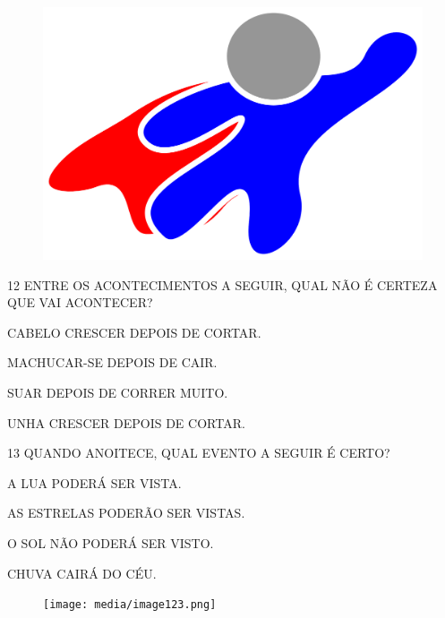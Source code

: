 \begin{figure}[H]
\includegraphics[width=\textwidth]{media/image122.png}
\end{figure}

\num{12} ENTRE OS ACONTECIMENTOS A SEGUIR, QUAL NÃO É CERTEZA QUE VAI
ACONTECER?

\begin{escolha}%
\item CABELO CRESCER DEPOIS DE CORTAR.

\item MACHUCAR-SE DEPOIS DE CAIR.

\item SUAR DEPOIS DE CORRER MUITO.

\item UNHA CRESCER DEPOIS DE CORTAR.
\end{escolha}

\num{13} QUANDO ANOITECE, QUAL EVENTO A SEGUIR É CERTO?

\begin{escolha}%
\item A LUA PODERÁ SER VISTA.

\item AS ESTRELAS PODERÃO SER VISTAS.

\item O SOL NÃO PODERÁ SER VISTO.

\item CHUVA CAIRÁ DO CÉU.
\end{escolha}

\begin{figure}[H]
\texttt{[image: media/image123.png]}
\end{figure}

